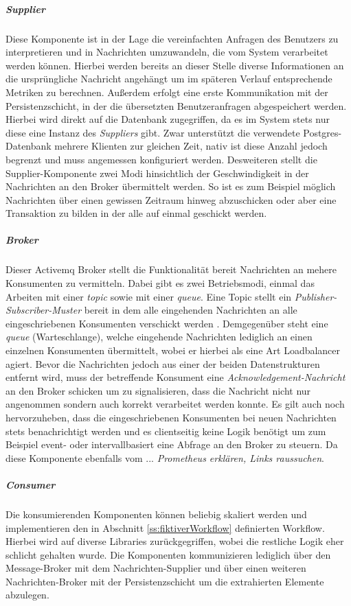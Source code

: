 \subparagraph{Supplier}
Diese Komponente ist in der Lage die vereinfachten Anfragen des Benutzers zu interpretieren und in Nachrichten umzuwandeln, die vom System verarbeitet werden können. Hierbei werden bereits an dieser Stelle diverse Informationen an die ursprüngliche Nachricht angehängt um im späteren Verlauf entsprechende Metriken zu berechnen. Außerdem erfolgt eine erste Kommunikation mit der Persistenzschicht, in der die übersetzten Benutzeranfragen abgespeichert werden. Hierbei wird direkt auf die Datenbank zugegriffen, da es im System stets nur diese eine Instanz des \emph{Suppliers} gibt. Zwar unterstützt die verwendete Postgres-Datenbank mehrere Klienten zur gleichen Zeit, nativ ist diese Anzahl jedoch begrenzt und muss angemessen konfiguriert werden. Desweiteren stellt die Supplier-Komponente zwei Modi hinsichtlich der Geschwindigkeit in der Nachrichten an den Broker übermittelt werden. So ist es zum Beispiel möglich Nachrichten über einen gewissen Zeitraum hinweg abzuschicken oder aber eine Transaktion zu bilden in der alle auf einmal geschickt werden.


\subparagraph{Broker}
Dieser Activemq Broker stellt die Funktionalität bereit Nachrichten an mehere Konsumenten zu vermitteln. Dabei gibt es zwei Betriebsmodi, einmal das Arbeiten mit einer \emph{topic} sowie mit einer \emph{queue}. Eine Topic stellt ein \emph{Publisher-Subscriber-Muster} bereit in dem alle eingehenden Nachrichten an alle eingeschriebenen Konsumenten verschickt werden . Demgegenüber steht eine \emph{queue} (Warteschlange), welche eingehende Nachrichten lediglich an einen einzelnen Konsumenten übermittelt, wobei er hierbei als eine Art Loadbalancer agiert. Bevor die Nachrichten jedoch aus einer der beiden Datenstrukturen entfernt wird, muss der betreffende Konsument eine \emph{Acknowledgement-Nachricht} an den Broker schicken um zu signalisieren, dass die Nachricht nicht nur angenommen sondern auch korrekt verarbeitet werden konnte. Es gilt auch noch hervorzuheben, dass die eingeschriebenen Konsumenten bei neuen Nachrichten stets benachrichtigt werden und es clientseitig keine Logik benötigt um zum Beispiel event- oder intervallbasiert eine Abfrage an den Broker zu steuern. Da diese Komponente ebenfalls vom ... \emph{Prometheus erklären, Links raussuchen}. 


\subparagraph{Consumer}
Die konsumierenden Komponenten können beliebig skaliert werden und implementieren den in Abschnitt \ref{ss:fiktiverWorkflow} definierten Workflow. Hierbei wird auf diverse Libraries zurückgegriffen, wobei die restliche Logik eher schlicht gehalten wurde. Die Komponenten kommunizieren lediglich über den Message-Broker mit dem Nachrichten-Supplier und über einen weiteren Nachrichten-Broker mit der Persistenzschicht um die extrahierten Elemente abzulegen.


